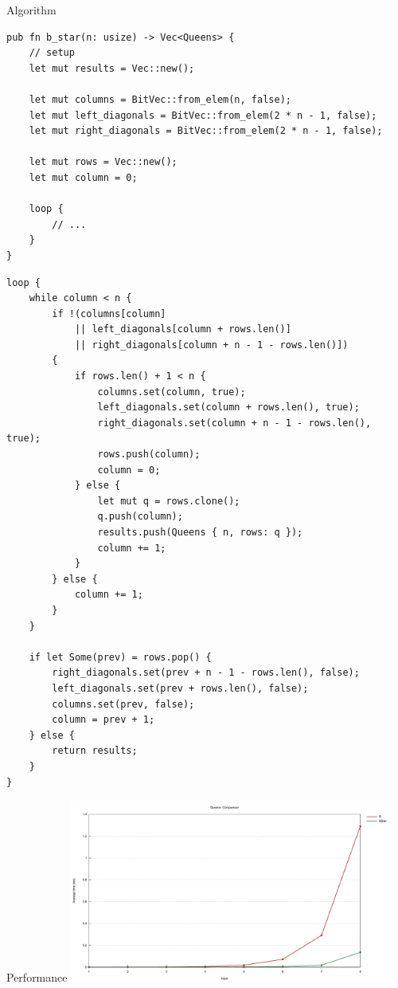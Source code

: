 \documentclass[aspectratio=43,t]{beamer}
\begin{document}
    \begin{frame}[fragile]{Algorithm}
      \begin{verbatim}
pub fn b_star(n: usize) -> Vec<Queens> {
    // setup
    let mut results = Vec::new();

    let mut columns = BitVec::from_elem(n, false);
    let mut left_diagonals = BitVec::from_elem(2 * n - 1, false);
    let mut right_diagonals = BitVec::from_elem(2 * n - 1, false);

    let mut rows = Vec::new();
    let mut column = 0;

    loop {
        // ...
    }
}     
        \end{verbatim}
    \end{frame}
  \begin{frame}[fragile]
    \begin{verbatim}
loop {
    while column < n {
        if !(columns[column]
            || left_diagonals[column + rows.len()]
            || right_diagonals[column + n - 1 - rows.len()])
        {
            if rows.len() + 1 < n {
                columns.set(column, true);
                left_diagonals.set(column + rows.len(), true);
                right_diagonals.set(column + n - 1 - rows.len(), true);
                rows.push(column);
                column = 0;
            } else {
                let mut q = rows.clone();
                q.push(column);
                results.push(Queens { n, rows: q });
                column += 1;
            }
        } else {
            column += 1;
        }
    }

    if let Some(prev) = rows.pop() {
        right_diagonals.set(prev + n - 1 - rows.len(), false);
        left_diagonals.set(prev + rows.len(), false);
        columns.set(prev, false);
        column = prev + 1;
    } else {
        return results;
    }
}
      \end{verbatim}
  \end{frame}
  
  \begin{frame}[fragile]{Performance}
    \includegraphics[width=0.8\textwidth, clip]{../img/queens_lines.pdf}
  \end{frame}
\end{document}
